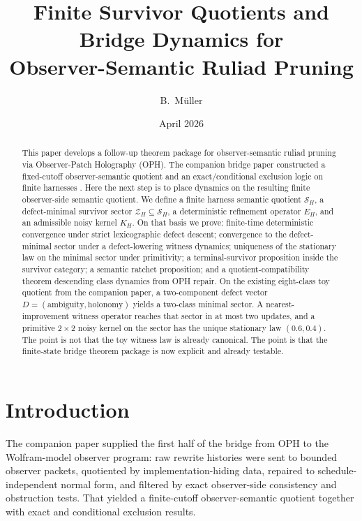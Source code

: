 \documentclass[11pt]{article}
\title{Finite Survivor Quotients and Bridge Dynamics for\\
Observer-Semantic Ruliad Pruning}
\author{B.\ M\"uller}
\date{April 2026}
\theoremstyle{remark}
\theoremstyle{plain}
\begin{document}
\maketitle

\begin{abstract}
This paper develops a follow-up theorem package for observer-semantic ruliad pruning via Observer-Patch Holography (OPH). The companion bridge paper constructed a fixed-cutoff observer-semantic quotient and an exact/conditional exclusion logic on finite harnesses \cite{muller2026quotients}. Here the next step is to place dynamics on the resulting finite observer-side semantic quotient. We define a finite harness semantic quotient \(\mathcal S_H\), a defect-minimal survivor sector \(\mathcal Z_H\subseteq \mathcal S_H\), a deterministic refinement operator \(E_H\), and an admissible noisy kernel \(K_H\). On that basis we prove: finite-time deterministic convergence under strict lexicographic defect descent; convergence to the defect-minimal sector under a defect-lowering witness dynamics; uniqueness of the stationary law on the minimal sector under primitivity; a terminal-survivor proposition inside the survivor category; a semantic ratchet proposition; and a quotient-compatibility theorem descending class dynamics from OPH repair. On the existing eight-class toy quotient from the companion paper, a two-component defect vector \(D=(\text{ambiguity},\text{holonomy})\) yields a two-class minimal sector. A nearest-improvement witness operator reaches that sector in at most two updates, and a primitive \(2\times 2\) noisy kernel on the sector has the unique stationary law \((0.6,0.4)\). The point is not that the toy witness law is already canonical. The point is that the finite-state bridge theorem package is now explicit and already testable.
\end{abstract}

\section{Introduction}

The companion paper \cite{muller2026quotients} supplied the first half of the bridge from OPH to the Wolfram-model observer program: raw rewrite histories were sent to bounded observer packets, quotiented by implementation-hiding data, repaired to schedule-independent normal form, and filtered by exact observer-side consistency and obstruction tests. That yielded a finite-cutoff observer-semantic quotient together with exact and conditional exclusion results.
\end{document}
